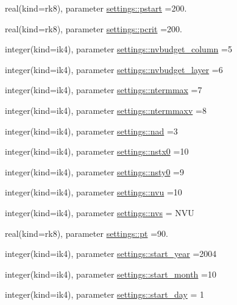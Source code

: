 \begin{DoxyCompactItemize}
\item 
real(kind=rk8), parameter \hyperlink{namespacesettings_a80b5ece3c388ad5e0c924f372afebe65}{settings\+::pstart} =200.
\item 
real(kind=rk8), parameter \hyperlink{namespacesettings_a8d5e7d0c921e46fc4b2c7d7738729805}{settings\+::pcrit} =200.
\item 
integer(kind=ik4), parameter \hyperlink{namespacesettings_a78876a80ce867f4bc71866b783b6de89}{settings\+::nvbudget\+\_\+column} =5
\item 
integer(kind=ik4), parameter \hyperlink{namespacesettings_a42675226258d1641f557f9e8e756b76e}{settings\+::nvbudget\+\_\+layer} =6
\item 
integer(kind=ik4), parameter \hyperlink{namespacesettings_a3e7f9f832f20c3352f6a1c901bf3d13b}{settings\+::ntermmax} =7
\item 
integer(kind=ik4), parameter \hyperlink{namespacesettings_acb91032130faf4bb56bee66af8cbf573}{settings\+::ntermmaxv} =8
\item 
integer(kind=ik4), parameter \hyperlink{namespacesettings_a4f624be133b88a44c8976b47b85e8eec}{settings\+::nad} =3
\item 
integer(kind=ik4), parameter \hyperlink{namespacesettings_a45f66b2df6e7509477bcf669702044a8}{settings\+::nstx0} =10
\item 
integer(kind=ik4), parameter \hyperlink{namespacesettings_a3989615b44f5121ea2e8761d6abc24e1}{settings\+::nsty0} =9
\item 
integer(kind=ik4), parameter \hyperlink{namespacesettings_a79e2ff19d589b215ed9176906dd5cbbf}{settings\+::nvu} =10
\item 
integer(kind=ik4), parameter \hyperlink{namespacesettings_ac10106479d8b3db1c5edd195b8dbf36e}{settings\+::nvs} = N\+VU
\item 
real(kind=rk8), parameter \hyperlink{namespacesettings_ac94cc887999dc993bb580baf0ce85ce3}{settings\+::pt} =90.
\item 
integer(kind=ik4), parameter \hyperlink{namespacesettings_a6feb18d2b9a31062fd7bc3f5533b0a4f}{settings\+::start\+\_\+year} =2004
\item 
integer(kind=ik4), parameter \hyperlink{namespacesettings_a10988f9d662713f7f29e611c9b6c873d}{settings\+::start\+\_\+month} =10
\item 
integer(kind=ik4), parameter \hyperlink{namespacesettings_a9d8f79c61533111bb5efd5ee1577108f}{settings\+::start\+\_\+day} = 1
\end{DoxyCompactItemize}
